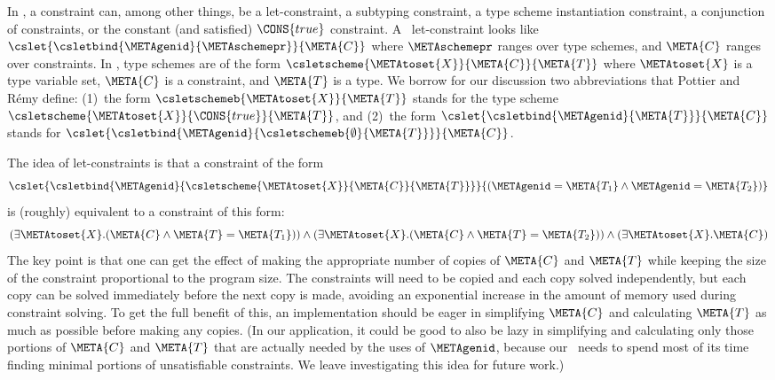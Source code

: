 \documentclass{jfp1}
\begin{document}
In \PR, a constraint can, among other things, be a let-constraint, a
subtyping constraint, a type scheme instantiation constraint, a
conjunction of constraints, or the constant (and satisfied)
$\CONS{true}$ constraint.
A \PR\ let-constraint looks like
\(
  \cslet{\csletbind{\METAgenid}{\METAschemepr}}
        {\META{C}}
\)
where $\METAschemepr$ ranges over type schemes, and $\META{C}$ ranges
over constraints.
In \PR, type schemes are of the form
$\csletscheme{\METAtoset{X}}{\META{C}}{\META{T}}$ where
$\METAtoset{X}$ is a type variable set, $\META{C}$ is a constraint, and
$\META{T}$ is a type.
We borrow for our discussion two abbreviations that Pottier and R\'emy
define: (1)~the form $\csletschemeb{\METAtoset{X}}{\META{T}}$ stands for the type
scheme $\csletscheme{\METAtoset{X}}{\CONS{true}}{\META{T}}$, and
(2)~the form $\cslet{\csletbind{\METAgenid}{\META{T}}}{\META{C}}$ stands for
$\cslet{\csletbind{\METAgenid}{\csletschemeb{\emptyset}{\META{T}}}}{\META{C}}$.



The idea of let-constraints is that a constraint of the form
$$
  \cslet{\csletbind{\METAgenid}{\csletscheme{\METAtoset{X}}{\META{C}}{\META{T}}}}
        {(\METAgenid = \META{T_1} \wedge \METAgenid = \META{T_2})}
$$
is (roughly) equivalent to a constraint of this form:
$$
  (\exists\METAtoset{X}.({\META{C}}\wedge\META{T} = \META{T_1}))
  \wedge
  (\exists\METAtoset{X}.({\META{C}}\wedge\META{T} = \META{T_2}))
  \wedge
  (\exists\METAtoset{X}.{\META{C}})
$$
The key point is that one can get the effect of making the appropriate
number of copies of $\META{C}$ and $\META{T}$ while keeping the size
of the constraint proportional to the program size.
The constraints will need to be copied and each copy solved independently, but each copy
can be solved immediately before the next copy is made, avoiding an
exponential increase in the amount of memory used during constraint solving.
To get the full benefit of this, an implementation should be eager in
simplifying $\META{C}$ and calculating $\META{T}$ as much as possible
before making any copies.
(In our application, it could be good to also be lazy in simplifying
and calculating only those portions of $\META{C}$ and $\META{T}$ that
are actually needed by the uses of $\METAgenid$, because our \TES\
needs to spend most of its time finding minimal portions
of unsatisfiable constraints.
We leave investigating this idea for future work.)

\end{document}
